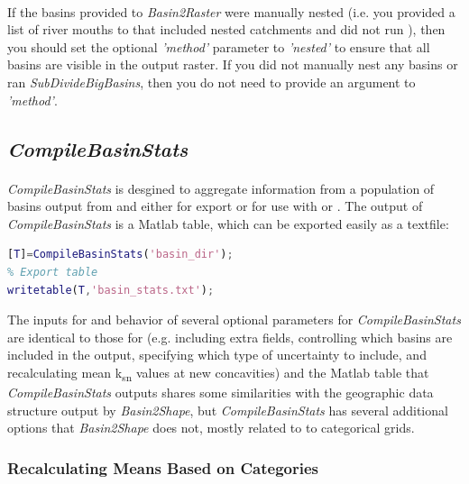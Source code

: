 \paragraph{}If the basins provided to \textit{Basin2Raster} were manually nested (i.e. you provided a list of river mouths to  that included nested catchments and did not run ), then you should set the optional \textit{'method'} parameter to \textit{'nested'} to ensure that all basins are visible in the output raster. If you did not manually nest any basins or ran \textit{SubDivideBigBasins}, then you do not need to provide an argument to \textit{'method'}.

\subsection{\textit{CompileBasinStats}} \label{sec:CompStats}
\paragraph{}\textit{CompileBasinStats} is desgined to aggregate information from a population of basins output from  and  either for export or for use with  or . The output of \textit{CompileBasinStats} is a Matlab table, which can be exported easily as a textfile:

\begin{lstlisting}[language=Matlab]
% Generate basin stats table
[T]=CompileBasinStats('basin_dir');
% Export table
writetable(T,'basin_stats.txt');
\end{lstlisting}

\noindent
The inputs for and behavior of several optional parameters for \textit{CompileBasinStats} are identical to those for  (e.g. including extra fields, controlling which basins are included in the output, specifying which type of uncertainty to include, and recalculating mean k\textsubscript{sn} values at new concavities) and the Matlab table that \textit{CompileBasinStats} outputs shares some similarities with the geographic data structure output by \textit{Basin2Shape}, but \textit{CompileBasinStats} has several additional options that \textit{Basin2Shape} does not, mostly related to to categorical grids.

\subsubsection{Recalculating Means Based on Categories}
